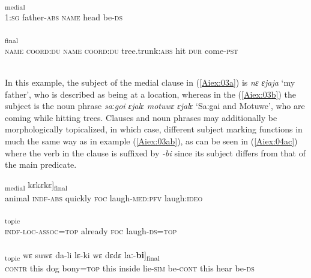 \documentclass[output=paper]{LSP/langsci}
\begin{document}
\begin{exe}
\ex \label{Aiex:03ab}
\begin{xlist}
\ex \label{Aiex:03a}
\textsubscript{medial}\\
\textsc{1}:\textsc{sg} father-\textsc{abs} \textsc{name} head be-\textsc{ds}\\
\glt {}\\
\ex \label{Aiex:03b}
\textsubscript{final}\\
‎\textsc{name} \textsc{coord}:\textsc{du} \textsc{name} \textsc{coord}:\textsc{du} tree.trunk:\textsc{abs} hit \textsc{dur} come-\textsc{pst}\\
\glt {}\\
\end{xlist}
\end{exe}

In this example, the subject of the medial clause in (\ref{Aiex:03a}) is \textit{nɛ ɛjaja} `my father', who is described as being at a location, whereas in the  (\ref{Aiex:03b}) the subject is the  noun phrase \textit{saːgoi ɛjalɛ motuwɛ ɛjalɛ} `Saːgai and Motuwe', who are coming while hitting trees. Clauses and noun phrases may additionally be morphologically topicalized, in which case, different subject marking functions in much the same way as in example (\ref{Aiex:03ab}), as can be seen in (\ref{Aiex:04ac}) where the verb in the  clause is suffixed by \textit{-bi} since its subject differs from that of the main predicate.

\begin{exe}
\ex \label{Aiex:04ac}
\begin{xlist}
\ex \label{Aiex:04a}
\gll [[na	no-wa ɛimɛ ka aɡlɛ-si]\textsubscript{medial} kɛkɛkɛ]\textsubscript{final}\\
animal	‎\textsc{indf}-‎\textsc{abs} quickly ‎\textsc{foc} laugh-‎\textsc{med}:‎\textsc{pfv} laugh:‎\textsc{ideo}\\
‎‎‎\glt {}\\
\ex \label{Aiex:04b}
\gll [no-wɛ-mi=jaː	ɛimɛ	ka	aɡlɛ-\textbf{bi}=jaː]\textsubscript{topic}\\
‎\textsc{indf}-‎\textsc{loc}-‎\textsc{assoc}=‎\textsc{top} already ‎\textsc{foc} laugh-‎\textsc{ds}=‎\textsc{top}\\
‎‎‎\glt {}\\
\ex \label{Aiex:04c}
\gll [[no	wɛ	aːɡɛ	kɛɡa=jaː]\textsubscript{topic}	wɛ	suwɛ	da-li	lɛ-ki	wɛ	dɛdɛ	laː-\textbf{bi}]\textsubscript{final}\\
\textsc{contr} this dog bony=‎\textsc{top} this inside lie-‎\textsc{sim} be-‎\textsc{cont} this hear be-‎\textsc{ds}\\
\glt {}\\
\end{xlist}
\end{exe}
\end{document}
